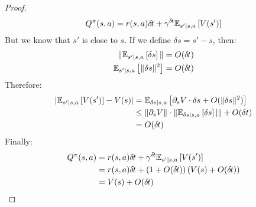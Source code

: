 \begin{proof}
  \begin{align}
    Q^\pi(s, a) &= r(s, a){\delta\hspace{-.1em}t} + \gamma^{\delta\hspace{-.1em}t} \mathbb{E}_{s'|s, a}\left[V(s')\right] \\
  \end{align}
  But we know that $s'$ is close to $s$. If we define $\delta s = s' - s$, then:
  \begin{align}
    \|\mathbb{E}_{s'|s, a}\left[\delta s\right]\| &= O({\delta\hspace{-.1em}t}) \\
    \mathbb{E}_{s'|s, a}\left[\|\delta s\|^2\right] &= O({\delta\hspace{-.1em}t})
  \end{align}
   Therefore:
  \begin{align}
    |\mathbb{E}_{s'|s, a}\left[V(s')\right] - V(s)| &= \mathbb{E}_{\delta s|s, a}\left[\partial_s V\cdot \delta s +O(\|\delta s\|^2)\right]\\
                                            &\leq \|\partial_s V\|\cdot \|\mathbb{E}_{\delta s|s, a}\left[\delta s\right]|\| +O(\delta t)\\
    &= O({\delta\hspace{-.1em}t})
  \end{align}
  Finally:
  \begin{align}
    Q^\pi(s, a) &= r(s, a){\delta\hspace{-.1em}t} + \gamma^{\delta\hspace{-.1em}t} \mathbb{E}_{s'|s, a}\left[V(s')\right] \\
                &= r(s, a){\delta\hspace{-.1em}t} + \left(1 + O({\delta\hspace{-.1em}t})\right)(V(s) + O({\delta\hspace{-.1em}t}))\\
    &= V(s) + O({\delta\hspace{-.1em}t})
  \end{align}
  \end{proof}
